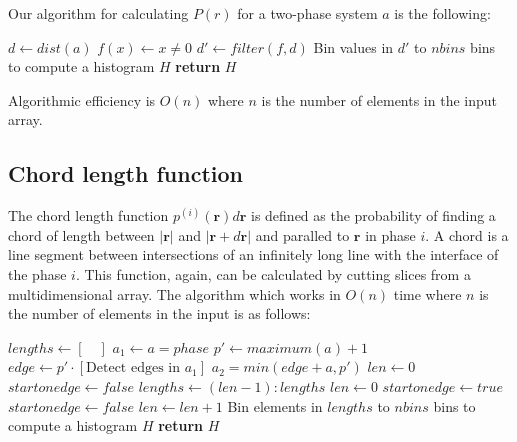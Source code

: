 \documentclass[reprint,amsmath,amssymb,aps,pre,showkeys,showpacs,nofootinbib]{revtex4-1}
\begin{document}
Our algorithm for calculating $P(r)$ for a two-phase system $a$ is the
following:
\begin{algorithmic}[1]
    \State $d \gets dist(a)$ 
    \State $f(x) \gets x \ne 0$
    \State $d' \gets filter(f, d)$
    \State Bin values in $d'$ to $nbins$ bins to compute a histogram $H$
    \State \textbf{return} $H$
  \EndProcedure
\end{algorithmic}
Algorithmic efficiency is $O(n)$ where $n$ is the number of elements in the
input array.

\subsection{Chord length function}
The chord length function $p^{(i)}(\bm{r})d\bm{r}$ is defined as the probability of
finding a chord of length between $|\bm{r}|$ and $|\bm{r} + d\bm{r}|$ and
paralled to $\bm{r}$ in phase $i$. A chord is a line segment between
intersections of an infinitely long line with the interface of the phase
$i$. This function, again, can be calculated by cutting slices from a
multidimensional array. The algorithm which works in $O(n)$ time where $n$ is
the number of elements in the input is as follows:
\begin{algorithmic}[1]
    \State $lengths \gets [\quad]$
    \State $a_1 \gets a = phase$
    \State $p' \gets maximum(a) + 1$ 
    \State $edge \gets p' \cdot [\text{Detect edges in $a_1$}]$ 
    \State $a_2 = min(edge + a, p')$ 
        \State $len \gets 0$
        \State $startonedge \gets false$
              \State $lengths \gets (len-1):lengths$
            \EndIf
            \State $len \gets 0$
            \State $startonedge \gets true$
            \State $startonedge \gets false$
          \EndIf
          \State $len \gets len + 1$
        \EndFor
      \EndFor
    \EndFor
    \State Bin elements in $lengths$ to $nbins$ bins to compute a histogram $H$
    \State \textbf{return} $H$
  \EndProcedure
\end{algorithmic}
\end{document}
